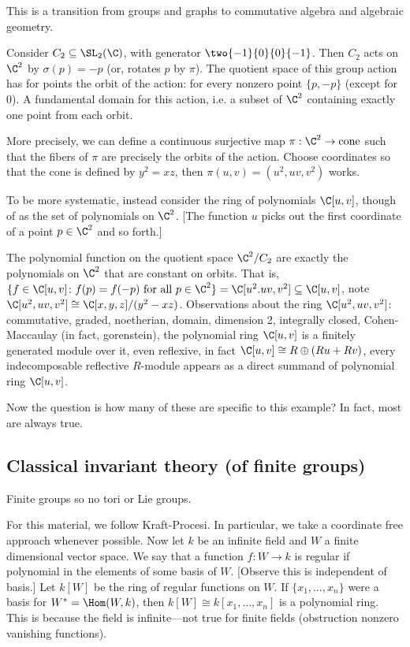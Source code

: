 This is a transition from groups and graphs to commutative algebra and algebraic geometry. 


\begin{ex}
Consider $C_2 \subseteq \SL_2(\C)$, with generator $\two{-1}{0}{0}{-1}$. Then $C_2$ acts on $\C^2$ by $\sigma(p)= -p$ (or, rotates $p$ by $\pi$). The quotient space of this group action has for points the orbit of the action: for every nonzero point $\{p,-p\}$ (except for 0). A fundamental domain for this action, i.e. a subset of $\C^2$ containing exactly one point from each orbit. 

More precisely, we can define a continuous surjective map $\pi: \C^2 \to \text{cone}$ such that the fibers of $\pi$ are precisely the orbits of the action. Choose coordinates so that the cone is defined by $y^2=xz$, then $\pi(u,v)= (u^2,uv,v^2)$ works. 

To be more systematic, instead consider the ring of polynomials $\C[u,v]$, though of as the set of polynomials on $\C^2$. [The function $u$ picks out the first coordinate of a point $p \in \C^2$ and so forth.] 

The polynomial function on the quotient space $\C^2/C_2$ are exactly the polynomials on $\C^2$ that are constant on orbits. That is, $\{f \in \C[u,v] \colon f(p)=f(-p) \text{ for all } p \in \C^2\}=\C[u^2.uv,v^2] \subseteq \C[u,v]$, note $\C[u^2,uv,v^2] \cong \C[x,y,z]/(y^2-xz)$. Observations about the ring $\C[u^2,uv,v^2]$: commutative, graded, noetherian, domain, dimension 2, integrally closed, Cohen-Maccaulay (in fact, gorenstein), the polynomial ring $\C[u,v]$ is a finitely generated module over it, even reflexive, in fact $\C[u,v] \cong R \oplus (Ru + Rv)$, every indecomposable reflective $R$-module appears as a direct summand of polynomial ring $\C[u,v]$. 
\end{ex}


Now the question is how many of these are specific to this example? In fact, most are always true. 



\subsection{Classical invariant theory (of finite groups)}

Finite groups so no tori or Lie groups. 

For this material, we follow Kraft-Procesi. In particular, we take a coordinate free approach whenever possible. Now let $k$ be an infinite field and $W$ a finite dimensional vector space. We say that a function $f: W \to k$ is regular if polynomial in the elements of some basis of $W$. [Observe this is independent of basis.] Let $k[W]$ be the ring of regular functions on $W$. If $\{x_1,\ldots,x_n\}$ were a basis for $W^*=\Hom(W,k)$, then $k[W] \cong k[x_1,\ldots,x_n]$ is a polynomial ring. This is because the field is infinite---not true for finite fields (obstruction nonzero vanishing functions). 

